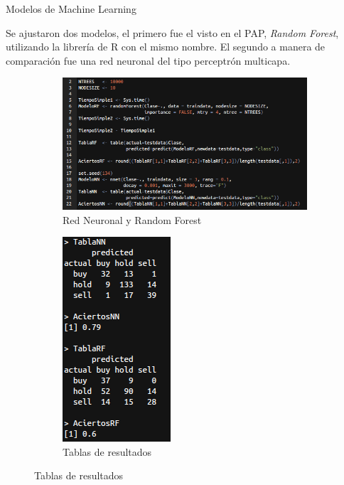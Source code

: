 \documentclass{bredelebeamer}
\begin{document}
\begin{frame}{Modelos de Machine Learning}

Se ajustaron dos modelos, el primero fue el visto en el PAP, \textit{Random Forest},
utilizando la librer\'ia de R con el mismo nombre. El segundo a manera de comparaci\'on
fue una red neuronal del tipo perceptr\'on multicapa.

\begin{figure}
\centering
\begin{subfigure}{.5\textwidth}
  \centering
  \includegraphics[width=1.25\linewidth]{images/Modelos.png}
  \caption{Red Neuronal y Random Forest }
\end{subfigure}%
\begin{subfigure}{.5\textwidth}
  \centering
  \includegraphics[width=.45\linewidth]{images/Tabla1.png}
  \caption{Tablas de resultados}
\end{subfigure}

\end{figure}



\end{frame}
\end{document}
